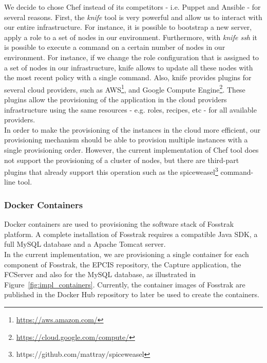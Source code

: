 We decide to chose Chef instead of its competitors - i.e. Puppet and Ansible - for several
reasons. First, the \textit{knife} tool is very powerful and allow us to
interact with our entire infrastructure. For instance, it is possible to bootstrap a new server,
apply a role to a set of nodes in our environment. Furthermore, with \textit{knife ssh} it is possible
to execute a command on a certain number of nodes in our environment. For instance, if we change
the role configuration that is assigned to a set of nodes in our infrastructure, knife allows to
update all these nodes with the most recent policy with a single command. Also, knife provides plugins
for several cloud providers, such as \gls{AWS}\footnote{\url{https://aws.amazon.com/}}, and Google
Compute Engine\footnote{\url{https://cloud.google.com/compute/}}. These plugins allow the
provisioning of the application in the cloud providers infrastructure using the same
resources - e.g. roles, recipes, etc - for all available providers.\\

In order to make the provisioning of the instances in the cloud more efficient, our
provisioning mechanism should be able to provision multiple instances with a single
provisioning order. However, the current implementation of Chef tool does not support
the provisioning of a cluster of nodes, but there are third-part plugins that already
support this operation such as the spiceweasel\footnote{https://github.com/mattray/spiceweasel}
command-line tool.

\subsubsection{Docker Containers}
\label{subs:impl_docker}
Docker containers are used to provisioning the software stack of Fosstrak platform. A complete
installation of Fosstrak requires a compatible Java \gls{SDK}, a full MySQL database and a Apache Tomcat
server.\\

In the current implementation, we are provisioning a single container for each component of Fosstrak, the \gls{EPCIS} repository,
the Capture application, the \gls{FCServer} and also for the MySQL database, as illustrated in Figure~\ref{fig:impl_containers}.
Currently, the container images of Fosstrak are published in the Docker Hub repository
to later be used to create the containers.\\

